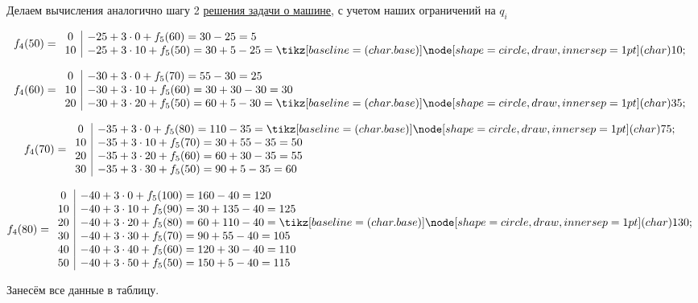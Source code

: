 \begin{enumerate}
	Делаем вычисления аналогично шагу 2 \hyperref[pr:car_on_island]{решения задачи о машине}, с учетом наших ограничений на $q_i$
	
	\[
	f_4(50) = \begin{array}{c|l}
		0 & -25 + 3 \cdot 0 + f_5(60) = 30 - 25 = 5 \\
		10 & -25 + 3 \cdot 10 + f_5(50) = 30 + 5 - 25 = \circled{10} \\
	\end{array}
	\]
	
	\[
	f_4(60) = \begin{array}{c|l}
		0 & -30 + 3 \cdot 0 + f_5(70) = 55 - 30 = 25 \\
		10 & -30 + 3 \cdot 10 + f_5(60) = 30 + 30 - 30 = 30 \\
		20 & -30 + 3 \cdot 20 + f_5(50) = 60 + 5 - 30 = \circled{35} \\
	\end{array}
	\]
	
	\[
	f_4(70) = \begin{array}{c|l}
		0 & -35 + 3 \cdot 0 + f_5(80) = 110 - 35 = \circled{75} \\
		10 & -35 + 3 \cdot 10 + f_5(70) = 30 + 55 - 35 = 50 \\
		20 & -35 + 3 \cdot 20 + f_5(60) = 60 + 30 - 35 = 55 \\
		30 & -35 + 3 \cdot 30 + f_5(50) = 90 + 5 - 35 = 60 \\
	\end{array}
	\]
	
	\[
	f_4(80) = \begin{array}{c|l}
		0 & -40 + 3 \cdot 0 + f_5(100) = 160 - 40 = 120 \\
		10 & -40 + 3 \cdot 10 + f_5(90) = 30 + 135 - 40 = 125 \\
		20 & -40 + 3 \cdot 20 + f_5(80) = 60 + 110 - 40 = \circled{130} \\
		30 & -40 + 3 \cdot 30 + f_5(70) = 90 + 55 - 40 = 105 \\
		40 & -40 + 3 \cdot 40 + f_5(60) = 120 + 30 - 40 = 110 \\
		50 & -40 + 3 \cdot 50 + f_5(50) = 150 + 5 - 40 = 115 \\
	\end{array}
	\]
	
	Занесём все данные в таблицу.
	

\end{enumerate}
